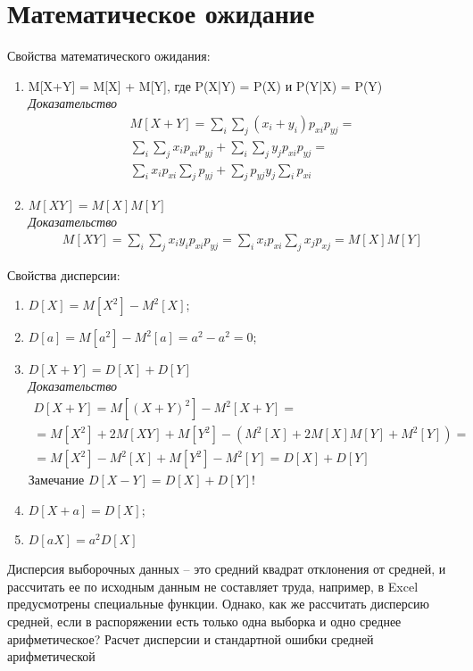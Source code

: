 \documentclass[14pt,a4paper]{article}
\begin{document}
\section{Математическое ожидание}
Свойства математического ожидания:
\begin{enumerate}
    \item M[X+Y] = M[X] + M[Y], где P(X|Y) = P(X) и P(Y|X) = P(Y) \\
    \textit{Доказательство}
    \begin{multline*}
        M[X+Y]  = \sum\limits_i\sum\limits_j(x_i + y_i)p_{xi}p_{yj} = \\ \sum\limits_i\sum\limits_jx_ip_{xi}p_{yj} + \sum\limits_i\sum\limits_jy_jp_{xi}p_{yj} = \\
        \sum\limits_ix_ip_{xi}\sum\limits_jp_{yj} + \sum\limits_jp_{yj}y_j\sum\limits_ip_{xi}
    \end{multline*}
    \item $M[XY] =  M[X]M[Y]$ \\
    \textit{Доказательство}
    \begin{multline*}
        M[XY] = \sum\limits_i\sum\limits_jx_i y_ip_{xi}p_{yj} = \sum\limits_ix_ip_{xi}\sum\limits_jx_jp_{xj} = M[X]M[Y] 
    \end{multline*}
\end{enumerate}

Свойства дисперсии:
\begin{enumerate}
    \item $D[X] = M[X^2] - M^2[X]$;
    \item $D[a] = M[a^2] - M^2[a] = a^2 - a^2 = 0$;
    \item $D[X+Y] = D[X] + D[Y]$ \\
    \textit{Доказательство} \\
    \begin{multline*}
        D[X+Y] = M[(X+Y)^2] - M^2[X+Y] = \\ = M[X^2]+ 2M[XY] + M[Y^2] - (M^2[X]+2M[X]M[Y]+M^2[Y]) = \\ = M[X^2] - M^2[X] + M[Y^2] - M^2[Y] = D[X] + D[Y]
    \end{multline*}
    Замечание $D[X-Y] = D[X] + D[Y]$!
    \item $D[X+a] = D[X]$;
    \item $D[aX] = a^2D[X]$
\end{enumerate}
Дисперсия выборочных данных – это средний квадрат отклонения от средней, и рассчитать ее по исходным данным не составляет труда, например, в Excel предусмотрены специальные функции. Однако, как же рассчитать дисперсию средней, если в распоряжении есть только одна выборка и одно среднее арифметическое?
Расчет дисперсии и стандартной ошибки средней арифметической
\end{document}

